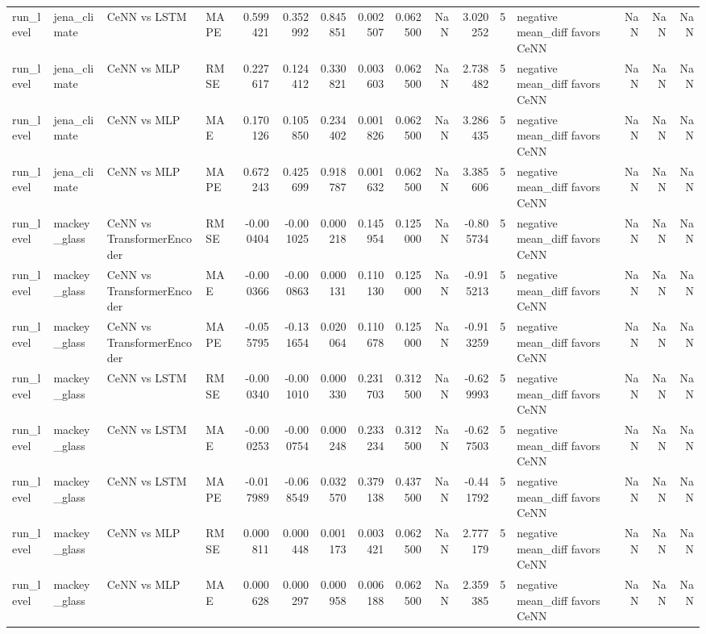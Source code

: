 \begin{tabular}{llllrrrrrrrrlrrr}
run_level & jena_climate & CeNN vs LSTM & MAPE & 0.599421 & 0.352992 & 0.845851 & 0.002507 & 0.062500 & NaN & 3.020252 & 5 & negative mean_diff favors CeNN & NaN & NaN & NaN \\
run_level & jena_climate & CeNN vs MLP & RMSE & 0.227617 & 0.124412 & 0.330821 & 0.003603 & 0.062500 & NaN & 2.738482 & 5 & negative mean_diff favors CeNN & NaN & NaN & NaN \\
run_level & jena_climate & CeNN vs MLP & MAE & 0.170126 & 0.105850 & 0.234402 & 0.001826 & 0.062500 & NaN & 3.286435 & 5 & negative mean_diff favors CeNN & NaN & NaN & NaN \\
run_level & jena_climate & CeNN vs MLP & MAPE & 0.672243 & 0.425699 & 0.918787 & 0.001632 & 0.062500 & NaN & 3.385606 & 5 & negative mean_diff favors CeNN & NaN & NaN & NaN \\
run_level & mackey_glass & CeNN vs TransformerEncoder & RMSE & -0.000404 & -0.001025 & 0.000218 & 0.145954 & 0.125000 & NaN & -0.805734 & 5 & negative mean_diff favors CeNN & NaN & NaN & NaN \\
run_level & mackey_glass & CeNN vs TransformerEncoder & MAE & -0.000366 & -0.000863 & 0.000131 & 0.110130 & 0.125000 & NaN & -0.915213 & 5 & negative mean_diff favors CeNN & NaN & NaN & NaN \\
run_level & mackey_glass & CeNN vs TransformerEncoder & MAPE & -0.055795 & -0.131654 & 0.020064 & 0.110678 & 0.125000 & NaN & -0.913259 & 5 & negative mean_diff favors CeNN & NaN & NaN & NaN \\
run_level & mackey_glass & CeNN vs LSTM & RMSE & -0.000340 & -0.001010 & 0.000330 & 0.231703 & 0.312500 & NaN & -0.629993 & 5 & negative mean_diff favors CeNN & NaN & NaN & NaN \\
run_level & mackey_glass & CeNN vs LSTM & MAE & -0.000253 & -0.000754 & 0.000248 & 0.233234 & 0.312500 & NaN & -0.627503 & 5 & negative mean_diff favors CeNN & NaN & NaN & NaN \\
run_level & mackey_glass & CeNN vs LSTM & MAPE & -0.017989 & -0.068549 & 0.032570 & 0.379138 & 0.437500 & NaN & -0.441792 & 5 & negative mean_diff favors CeNN & NaN & NaN & NaN \\
run_level & mackey_glass & CeNN vs MLP & RMSE & 0.000811 & 0.000448 & 0.001173 & 0.003421 & 0.062500 & NaN & 2.777179 & 5 & negative mean_diff favors CeNN & NaN & NaN & NaN \\
run_level & mackey_glass & CeNN vs MLP & MAE & 0.000628 & 0.000297 & 0.000958 & 0.006188 & 0.062500 & NaN & 2.359385 & 5 & negative mean_diff favors CeNN & NaN & NaN & NaN \\

\end{tabular}
